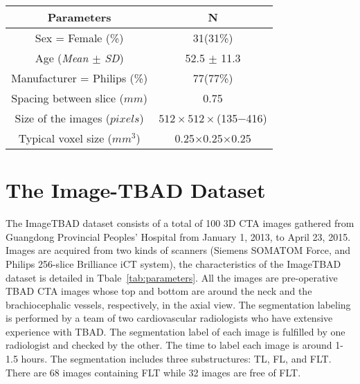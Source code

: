 \documentclass{article}
\begin{document}
\begin{table*}[!t]
\caption{Characteristics of the ImageTBAD dataset.}
\centering
\begin{tabular}{cc}
\hline
Parameters                & N                 \\ \hline
Sex = Female (\%)                & 31(31\%)          \\
Age (\textit{Mean $\pm$ SD})             & 52.5 $\pm$ 11.3       \\
Manufacturer = Philips (\%)                   & 77(77\%)          \\
Spacing between slice ($mm$) & 0.75              \\
Size of the images ($pixels$)    & $512\times 512\times$(135$-$416) \\
Typical voxel size ($mm^3$)        & 0.25$\times$0.25$\times$0.25   \\ \hline
\end{tabular}
\label{tab:parameters}
\end{table*}



\section{The Image-TBAD Dataset}\label{sec:dataset}

The ImageTBAD dataset consists of a total of 100 3D CTA images 
gathered from Guangdong Provincial Peoples' Hospital %
from January 1, 2013, to April 23, 2015. 
Images are acquired from two kinds of scanners 
(Siemens SOMATOM Force, and Philips 256-slice Brilliance iCT system), 
the characteristics of the ImageTBAD dataset is detailed in Tbale~\ref{tab:parameters}.
All the images are pre-operative TBAD CTA images whose top and bottom are around the neck and the brachiocephalic vessels, respectively, in the axial view.
The segmentation labeling is performed by a team of two cardiovascular radiologists who have extensive experience with TBAD. 
The segmentation label of each image is fulfilled by one radiologist and checked by the other. 
The time to label each image is around 1-1.5 hours. 
The segmentation includes three substructures: TL, FL, and FLT.
There are 68 images containing FLT while 32 images are free of FLT.
\end{document}
